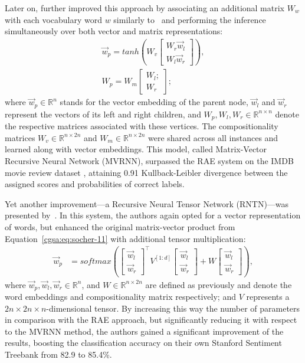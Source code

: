 Later on, \citet{Socher:12} further improved this approach by
associating an additional matrix $W_w$ with each vocabulary word $w$
similarly to~\citet{Yessenalina:10} and performing the inference
simultaneously over both vector and matrix representations:
\begin{align*}
  \vec{w}_p = tanh\left(W_v \begin{bmatrix}W_r\vec{w}_l\\
      W_l \vec{w}_r\end{bmatrix} \right),\\
  W_p = W_m \begin{bmatrix}W_l;\\
    W_r\end{bmatrix};
\end{align*}
where $\vec{w}_p\in\mathbb{R}^n$ stands for the vector embedding of
the parent node, $\vec{w}_l$ and $\vec{w}_r$ represent the vectors of
its left and right children, and $W_p, W_l, W_r \in
\mathbb{R}^{n\times n}$ denote the respective matrices associated with
these vertices.  The compositionality matrices
$W_v\in\mathbb{R}^{n\times 2n}$ and $W_m\in\mathbb{R}^{n\times 2n}$
were shared across all instances and learned along with vector
embeddings.  This model, called Matrix-Vector Recursive Neural Network
(MVRNN), surpassed the RAE system on the IMDB movie review dataset
\cite{Pang:05}, attaining 0.91 Kullback-Leibler divergence between the
assigned scores and probabilities of correct labels.

Yet another improvement---a Recursive Neural Tensor Network
(RNTN)---was presented by~\citet{Socher:13}.  In this system, the
authors again opted for a vector representation of words, but enhanced
the original matrix-vector product from
Equation~\ref{cgsa:eq:socher-11} with additional tensor
multiplication:
\begin{align*}
  \vec{w}_p &= softmax\left(\begin{bmatrix}
  \vec{w}_l\\
  \vec{w}_r
  \end{bmatrix}^{\top}V^{[1:d]}\begin{bmatrix}
  \vec{w}_l\\
  \vec{w}_r
  \end{bmatrix}
            + W\begin{bmatrix}
  \vec{w}_l\\
  \vec{w}_r
\end{bmatrix}\right),\label{cgsa:eq:socher-13}
\end{align*}
where $\vec{w}_p, \vec{w}_l, \vec{w}_r\in\mathbb{R}^n$, and
$W\in\mathbb{R}^{n\times 2n}$ are defined as previously and denote the
word embeddings and compositionality matrix respectively; and $V$
represents a $2n\times 2n\times n$-dimensional tensor.  By increasing
this way the number of parameters in comparison with the RAE approach,
but significantly reducing it with respect to the MVRNN method, the
authors gained a significant improvement of the results, boosting the
classification accuracy on their own Stanford Sentiment Treebank from
82.9 to 85.4\%.

